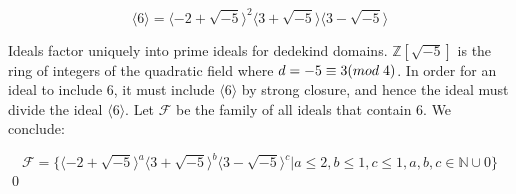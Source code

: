 \documentclass{article}
\newcommand{\new}[1]{
    \vspace{2mm}
    \noindent
    \textbf{
    \underline{#1}}
}
\def\ZZ{{\mathbb{Z}}}
\def\_{{\hspace{1mm}}}
\newcommand{\Proof}{{
    \vspace{2mm}
    \noindent
    \textbf{
    \underline{Proof}}
}
}
\newcommand{\textOr}{
    \hspace{5mm}
    \textrm{or}
    \hspace{5mm}
}
\newcommand{\<}{{{
    \langle
}}}
\def\>{{{
    \rangle
}}}
\def\ZZ{{\mathbb{Z}}}
\begin{document}
\[
    \<6\> = \<-2+\sqrt{-5}\>^2\<3+\sqrt{-5}\>\<3-\sqrt{-5}\>
\]

Ideals factor uniquely into prime ideals for dedekind domains. 
$\ZZ[\sqrt{-5}]$ is the ring of integers of the quadratic field 
where $d = -5 \equiv 3 (mod\_4)$. In order for an ideal to include 
6, it must include $\<6\>$ by strong closure, and hence the ideal 
must divide the ideal $\<6\>$. Let $\mathcal{F}$ be the family of 
all ideals that contain 6. We conclude:

\[
    \mathcal{F} = 
    \{
        \<-2+\sqrt{-5}\>^a\<3+\sqrt{-5}\>^b\<3-\sqrt{-5}\>^c
        |
        a \leq 2, b \leq 1, c \leq 1, a,b,c \in \mathbb{N} \cup {0}
    \}
\]
\qed


\begin{comment}
\new{Proposition} In the ring $\ZZ[\sqrt{-5}]$, elements with norm 
4, 6, 9 are irreducible. 

\Proof
If such an element is not prime, there must exist a nonunit divisor 
that has a norm of 2 or 3. Assume there exists some ring element 
$\alpha = a+b\sqrt{-5}$ that has a norm of 2 or 3. It must be:

\[
    a^2+b^2 = 2 \textOr a^2+b^2=3
\]

Both equations have no integer solutions. \qed

\new{Proposition} The only factorization of 6 in the ring 
$\ZZ[\sqrt{-5}]$ is:

\[
    6 = 2\cdot 3 \textOr 6 = (1+\sqrt{-5})(1-\sqrt{-5})
\]

\Proof
Compute $N(6) = 36$. The possible nonunit divisors of 36 are:

\[n = 2, 3, 4, 6, 9, 12, 18, 36\]

Let $n$ be the norm of some divisor of 6. We can 
eliminate $n = 2, 3$ for no element can have such a norm 
in the ring $\ZZ[\sqrt{-5}]$. For $n \geq 6$, the symmetry will 
guarantee that the norm of the other divisor will fall into 
the values of $n$ that are less than 6. 

We are left with:

\[
    n = 4, 6
\]

$n = 4$ implies that the element in question is exclusively 
$2$. $n = 6$ implies the element is one of $1 \pm \sqrt{-5}$
By the first proposition, these elements along with their 
corresponding 6-conjugates are also irreducible. \qed

\new{Corollary 1}
The divisors of 6 in $\ZZ[\sqrt{-5}]$ are:

\[
    \{2, 3, 1\pm\sqrt{-5}\}
\]


\end{comment}
\end{document}
